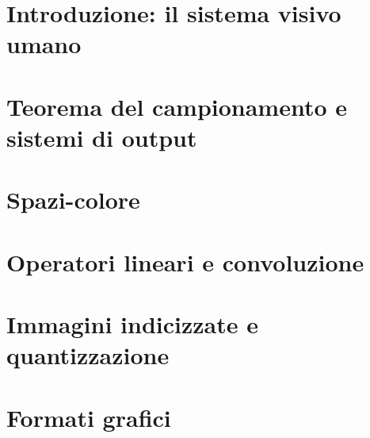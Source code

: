 \documentclass{article}
\begin{document}


\tableofcontents
\restoregeometry

\section{Introduzione: il sistema visivo umano}


\section{Teorema del campionamento e sistemi di output}


\section{Spazi-colore}


\section{Operatori lineari e convoluzione}


\section{Immagini indicizzate e quantizzazione}


\section{Formati grafici}

\end{document}
